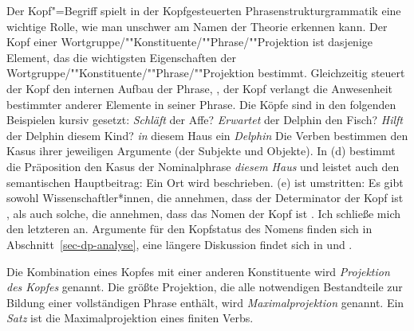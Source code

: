 Der Kopf"=Begriff spielt in der Kopfgesteuerten Phrasenstrukturgrammatik
eine wichtige Rolle, wie man unschwer am Namen der Theorie erkennen kann.
Der Kopf einer Wortgruppe/""Konstituente/""Phrase/""Projektion ist dasjenige Element,
das die wichtigsten Eigenschaften der Wortgruppe/""Konstituente/""Phrase/""Projektion bestimmt.
Gleichzeitig steuert der Kopf den internen Aufbau der Phrase, \dash, der Kopf verlangt
die Anwesenheit bestimmter anderer Elemente in seiner Phrase. Die Köpfe sind
in den folgenden Beispielen kursiv gesetzt:
\eal
\ex \emph{Schläft} der Affe?
\ex \emph{Erwartet} der Delphin den Fisch?
\ex \emph{Hilft} der Delphin diesem Kind?
\ex \emph{in} diesem Haus
\ex ein \emph{Delphin}
\zl
Die Verben bestimmen den Kasus ihrer jeweiligen Argumente (der Subjekte und Objekte).
In (d) bestimmt die Präposition den Kasus der Nominalphrase \emph{diesem Haus} und
leistet auch den semantischen Hauptbeitrag: Ein Ort wird beschrieben. (e)
ist umstritten: Es gibt sowohl Wissenschaftler*innen, die annehmen, dass der Determinator
der Kopf ist
\parencites[]{Ajdukiewicz35a-u}[231]{VH77a-u}[Abschnitt~6]{Brame81a-u}{Brame82a}[--92]{Hudson84a-u}{Hellan86a,Abney87a,Netter94,Netter98a}, als auch solche, die annehmen,
dass das Nomen der Kopf ist \parencites{vanLangendonck94a}[]{ps2}{Demske2001a}{Hudson2004a}{Bruening2009a}{MyPM2021a}{MuellerHeadless}.
Ich schließe mich den letzteren an. Argumente für den Kopfstatus des Nomens
finden sich in Abschnitt~\ref{sec-dp-analyse}, eine längere Diskussion findet sich in
 und .

Die Kombination eines Kopfes mit einer anderen Konstituente wird \emph{Projektion
des Kopfes} genannt. Die größte Projektion, die alle notwendigen Bestandteile zur Bildung
einer vollständigen Phrase enthält, wird \emph{Maximalprojektion}
genannt. Ein \emph{Satz} ist die Maximalprojektion eines finiten Verbs.

